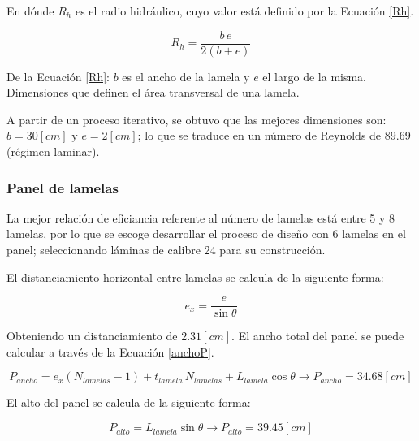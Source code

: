 \noindent
\justify

En d\'onde $R_h$ es el radio hidr\'aulico, cuyo valor est\'a definido por la Ecuaci\'on \ref{Rh}.

\begin{equation}
	R_h = \frac{b \, e}{2(b+e)}
	\label{Rh}
\end{equation}

\noindent
\justify

De la Ecuaci\'on \ref{Rh}: $b$ es el ancho de la lamela y $e$ el largo de la misma. Dimensiones que definen el \'area transversal de una lamela. 

\noindent
\justify

A partir de un proceso iterativo, se obtuvo que las mejores dimensiones son: $b = 30 [cm]$ y $e = 2 [cm]$; lo que se traduce en un n\'umero de Reynolds de $89.69$ (r\'egimen laminar).

\subsubsection{Panel de lamelas}

\noindent
\justify

La mejor relaci\'on de eficiancia referente al n\'umero de lamelas est\'a entre 5 y 8 lamelas, por lo que se escoge desarrollar el proceso de dise\~no con 6 lamelas en el panel; seleccionando l\'aminas de calibre 24 para su construcci\'on.

\noindent
\justify

El distanciamiento horizontal entre lamelas se calcula de la siguiente forma:

\begin{equation}
	e_x = \frac{e}{\sin \theta}
\end{equation}

\noindent
\justify

Obteniendo un distanciamiento de $2.31 [cm]$. El ancho total del panel se puede calcular a trav\'es de la Ecuaci\'on \ref{anchoP}.

\begin{equation}
	P_{ancho} = e_x (N_{lamelas}-1) + t_{lamela} \, N_{lamelas} + L_{lamela} \cos \theta \rightarrow P_{ancho} = 34.68 [cm]
	\label{anchoP}
\end{equation}

\noindent
\justify

El alto del panel se calcula de la siguiente forma:

\begin{equation}
	P_{alto} = L_{lamela} \sin \theta \rightarrow P_{alto} = 39.45 [cm]
\end{equation}

